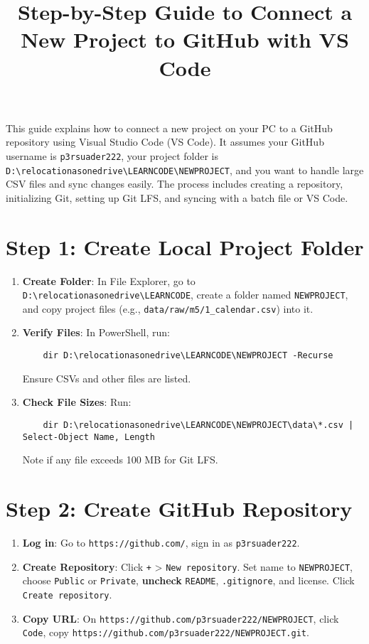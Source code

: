 \documentclass[a4paper,12pt]{article}
\title{Step-by-Step Guide to Connect a New Project to GitHub with VS Code}
\author{}
\date{}
\begin{document}
\maketitle

This guide explains how to connect a new project on your PC to a GitHub repository using Visual Studio Code (VS Code). It assumes your GitHub username is \texttt{p3rsuader222}, your project folder is \texttt{D:\textbackslash relocationasonedrive\textbackslash LEARNCODE\textbackslash NEWPROJECT}, and you want to handle large CSV files and sync changes easily. The process includes creating a repository, initializing Git, setting up Git LFS, and syncing with a batch file or VS Code.

\section{Step 1: Create Local Project Folder}
\begin{enumerate}[label=\arabic*.]
    \item \textbf{Create Folder}: In File Explorer, go to \texttt{D:\textbackslash relocationasonedrive\textbackslash LEARNCODE}, create a folder named \texttt{NEWPROJECT}, and copy project files (e.g., \texttt{data/raw/m5/1\_calendar.csv}) into it.
    \item \textbf{Verify Files}: In PowerShell, run:
    \begin{verbatim}
    dir D:\relocationasonedrive\LEARNCODE\NEWPROJECT -Recurse
    \end{verbatim}
    Ensure CSVs and other files are listed.
    \item \textbf{Check File Sizes}: Run:
    \begin{verbatim}
    dir D:\relocationasonedrive\LEARNCODE\NEWPROJECT\data\*.csv | Select-Object Name, Length
    \end{verbatim}
    Note if any file exceeds 100 MB for Git LFS.
\end{enumerate}

\section{Step 2: Create GitHub Repository}
\begin{enumerate}[label=\arabic*.]
    \item \textbf{Log in}: Go to \texttt{https://github.com/}, sign in as \texttt{p3rsuader222}.
    \item \textbf{Create Repository}: Click \texttt{+} > \texttt{New repository}. Set name to \texttt{NEWPROJECT}, choose \texttt{Public} or \texttt{Private}, \textbf{uncheck} \texttt{README}, \texttt{.gitignore}, and license. Click \texttt{Create repository}.
    \item \textbf{Copy URL}: On \texttt{https://github.com/p3rsuader222/NEWPROJECT}, click \texttt{Code}, copy \texttt{https://github.com/p3rsuader222/NEWPROJECT.git}.
\end{enumerate}
\end{document}
